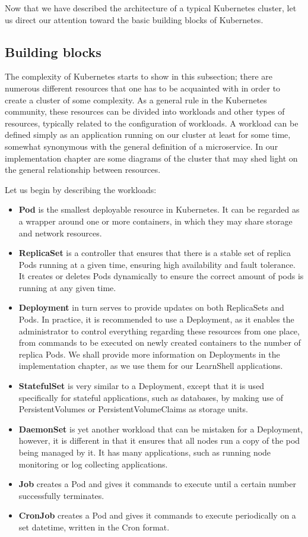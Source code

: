 \documentclass[thesis=B,english]{FITthesis}[2019/12/23]
\begin{document}
Now that we have described the architecture of a typical Kubernetes cluster, let us direct our attention toward the basic building blocks of Kubernetes.

\subsection{Building blocks}

The complexity of Kubernetes starts to show in this subsection; there are numerous different resources that one has to be acquainted with in order to create a cluster of some complexity. As a general rule in the Kubernetes community, these resources can be divided into workloads and other types of resources, typically related to the configuration of workloads. A workload can be defined simply as an application running on our cluster at least for some time, somewhat synonymous with the general definition of a microservice. \cite{kube-workloads} In our implementation chapter are some diagrams of the cluster that may shed light on the general relationship between resources.

Let us begin by describing the workloads:

\begin{itemize}
  \setlength\itemsep{0em}
  \item \textbf{Pod} is the smallest deployable resource in Kubernetes. It can be regarded as a wrapper around one or more containers, in which they may share storage and network resources.
  \item \textbf{ReplicaSet} is a controller that ensures that there is a stable set of replica Pods running at a given time, ensuring high availability and fault tolerance. It creates or deletes Pods dynamically to ensure the correct amount of pods is running at any given time.
  \item \textbf{Deployment} in turn serves to provide updates on both ReplicaSets and Pods. In practice, it is recommended to use a Deployment, as it enables the administrator to control everything regarding these resources from one place, from commands to be executed on newly created containers to the number of replica Pods. We shall provide more information on Deployments in the implementation chapter, as we use them for our LearnShell applications.
  \item \textbf{StatefulSet} is very similar to a Deployment, except that it is used specifically for stateful applications, such as databases, by making use of PersistentVolumes or PersistentVolumeClaims as storage units.
  \item \textbf{DaemonSet} is yet another workload that can be mistaken for a Deployment, however, it is different in that it ensures that all nodes run a copy of the pod being managed by it. It has many applications, such as running node monitoring or log collecting applications.
  \item \textbf{Job} creates a Pod and gives it commands to execute until a certain number successfully terminates.
  \item \textbf{CronJob} creates a Pod and gives it commands to execute periodically on a set datetime, written in the Cron format.
\end{itemize}
\end{document}
